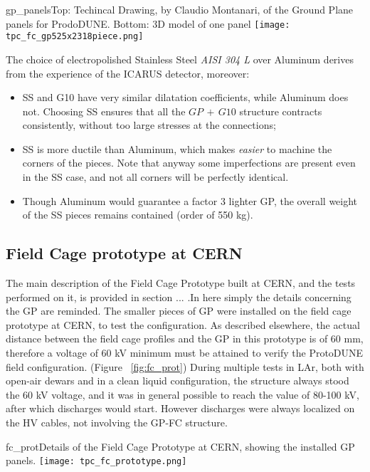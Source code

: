 \begin{cdrfigure}[ProtoDUNE GP]{gp_panels}{Top: Techincal Drawing, by Claudio Montanari, of the Ground Plane panels for ProdoDUNE. Bottom: 3D model of one panel}
\texttt{[image: tpc\_fc\_gp525x2318piece.png]}
\end{cdrfigure}


The choice of electropolished Stainless Steel \textit{AISI 304 L} over Aluminum derives from the experience of the ICARUS detector, moreover:
\begin{itemize}
\item SS and G10 have very similar dilatation coefficients, while Aluminum does not. Choosing SS ensures that all the $GP\,+\,G10$ structure contracts consistently, without too large stresses at the connections; 
\item SS is more ductile than Aluminum, which makes \textit{easier} to machine the corners of the pieces. Note that anyway some imperfections are present even in the SS case, and not all corners will be perfectly identical. 
\item Though Aluminum would guarantee a factor 3 lighter GP, the overall weight of the SS pieces remains contained (order of 550 kg).
\end{itemize}

\subsection{Field Cage prototype at CERN}
The main description of the Field Cage Prototype built at CERN, and the tests performed on it, is provided in section ... .In here simply the details concerning the GP are reminded. The smaller pieces of GP were installed on the field cage prototype at CERN, to test the configuration. As described elsewhere, the actual distance between the field cage profiles and the GP in this prototype is of 60 mm, therefore a voltage of 60 kV minimum must be attained to verify the ProtoDUNE field configuration. (Figure ~\ref{fig:fc_prot}) During multiple tests in LAr, both with open-air dewars and in a clean liquid configuration, the structure always stood the 60 kV voltage, and it was in general possible to reach the value of 80-100 kV, after which discharges would start. However discharges were always localized on the HV cables, not involving the GP-FC structure.

\begin{cdrfigure}{fc_prot}{Details of the Field Cage Prototype at CERN, showing the installed GP panels.}
\texttt{[image: tpc\_fc\_prototype.png]}
\end{cdrfigure}

